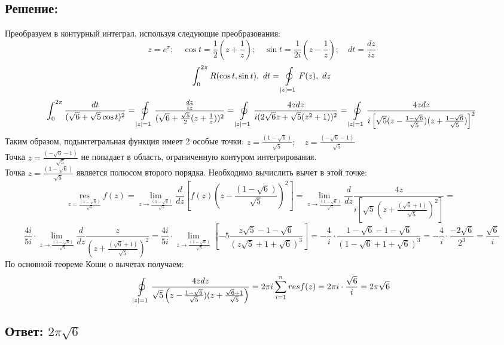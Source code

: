 \documentclass{article}
\begin{document}
        \subsection{Решение:}
        Преобразуем в контурный интеграл, используя следующие преобразования:
        $$z = e^\pi; \quad \cos{t} = \frac{1}{2}\left( z + \frac{1}{z}\right); \quad \sin{t} = \frac{1}{2i} \left( z - \frac{1}{z}\right); \quad dt = \frac{dz}{iz}$$
        \[
        \int_{0}^{2\pi} R(\cos{t}, \sin{t}) ,\ dt = \ointop_{|z| = 1} F(z) ,\ dz
        \]
        \[
        \int_{0}^{2\pi} \frac{dt}{(\sqrt{6} + \sqrt{5}\cos{t})^2} = \ointop_{|z| = 1} \frac{\frac{dz}{iz}}{(\sqrt{6} + \frac{\sqrt{5}}{2} (z + \frac{1}{z}))^2} = \ointop_{|z| = 1}  \frac{4zdz}{i(2\sqrt{6}z + \sqrt{5}(z^2 + 1))^2} = \ointop_{|z| = 1} \frac{4zdz}{i \left[ \sqrt{5}(z - \frac{1 - \sqrt{6}}{\sqrt{5}}) (z + \frac{1 - \sqrt{6}}{\sqrt{5}})\right]^2}
        \]
        Таким образом, подынтегральная функция имеет 2 особые точки: $z = \frac{(1 - \sqrt{6})}{\sqrt{5}}; \quad z = \frac{(- \sqrt{6} - 1)}{\sqrt{5}}$ \\
        Точка $ z = \frac{(- \sqrt{6} - 1)}{\sqrt{5}}$ не попадает в область, ограниченную контуром интегрирования. \\
        Точка $z = \frac{(1 - \sqrt{6})}{\sqrt{5}}$ является полюсом второго порядка. Необходимо вычислить вычет в этой точке:
        \[
         \underset{z = \frac{(1 - \sqrt{6})}{\sqrt{5}}}{\text{res}}\ f(z) = \lim\limits_{z\rightarrow \frac{(1 - \sqrt{6})}{\sqrt{5}}} \frac{d}{dz}\left[ f(z)(z -  \frac{(1 - \sqrt{6})}{\sqrt{5}})^2\right] = \lim\limits_{z\rightarrow \frac{(1 - \sqrt{6})}{\sqrt{5}}} \frac{d}{dz} \frac{4z}{i \left[\sqrt{5}(z + \frac{(\sqrt{6} + 1)}{\sqrt{5}})^2 \right] } = 
        \]
        \[
        \frac{4i}{5i} \cdot \lim\limits_{z\rightarrow \frac{(1 - \sqrt{6})}{\sqrt{5}}} \frac{d}{dz} \frac{z}{(z + \frac{(\sqrt{6} + 1)}{\sqrt{5}})^2} = \frac{4i}{5i} \cdot \lim\limits_{z\rightarrow \frac{(1 - \sqrt{6})}{\sqrt{5}}} \left[-5\frac{z\sqrt{5} - 1 - \sqrt{6}}{(z\sqrt{5} + 1 + \sqrt{6})^3} \right] = -\frac{4}{i} \cdot \frac{1 - \sqrt{6} - 1 - \sqrt{6}}{(1 - \sqrt{6} + 1 + \sqrt{6})^3} = -\frac{4}{i} \cdot \frac{-2\sqrt{6}}{2^3} = \frac{\sqrt{6}}{i}
        \]
        По основной теореме Коши о вычетах получаем:
        \[
         \ointop_{|z| = 1}\frac{4zdz}{\sqrt{5} \left(z -\frac{1 - \sqrt{6}}{\sqrt{5}}) (z + \frac{ \sqrt{6} + 1}{\sqrt{5}} \right)} = 2\pi i \sum\limits_{i = 1}^{n} resf(z) = 2\pi i \cdot \frac{\sqrt{6}}{i} = 2\pi\sqrt{6}
        \]
        \subsection{Ответ: $2\pi\sqrt{6}$}
\end{document}
